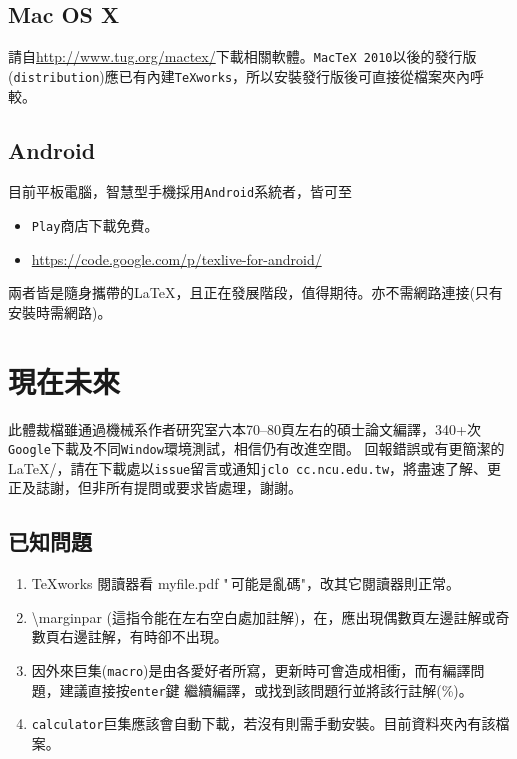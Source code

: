 \section{Mac OS X}
請自\url{http://www.tug.org/mactex/}下載相關軟體。{\tt MacTeX 2010}以後的發行版({\tt distribution})應已有內建{\tt TeXworks}，所以安裝發行版後可直接從檔案夾內呼較。
\section{Android}
目前平板電腦，智慧型手機採用{\tt Android}系統者，皆可至
\begin{itemize}
\item {\tt Play}商店下載免費。
\item \url{https://code.google.com/p/texlive-for-android/}
\end{itemize}
兩者皆是隨身攜帶的\LaTeX，且正在發展階段，值得期待。亦不需網路連接(只有安裝時需網路)。

\chapter{現在未來}
此體裁檔雖通過機械系作者研究室六本70--80頁左右的碩士論文編譯，340+次{\tt Google}下載及不同{\tt Window}環境測試，相信仍有改進空間。 回報錯誤或有更簡潔的\LaTeX/，請在下載處以{\tt issue}留言或通知{\tt jclo cc.ncu.edu.tw}，將盡速了解、更正及誌謝，但非所有提問或要求皆處理，謝謝。

\section{已知問題}
\begin{enumerate}
\item TeXworks 閱讀器看 myfile.pdf "\,可能是亂碼"，改其它閱讀器則正常。
\item   \textbackslash marginpar (這指令能在左右空白處加註解)，在，應出現偶數頁左邊註解或奇數頁右邊註解，有時卻不出現。
\item 因外來巨集({\tt macro})是由各愛好者所寫，更新時可會造成相衝，而有編譯問題，建議直接按{\tt enter}鍵 繼續編譯，或找到該問題行並將該行註解(\%)。
\item {\tt calculator}巨集應該會自動下載，若沒有則需手動安裝。目前資料夾內有該檔案。
\end{enumerate}

